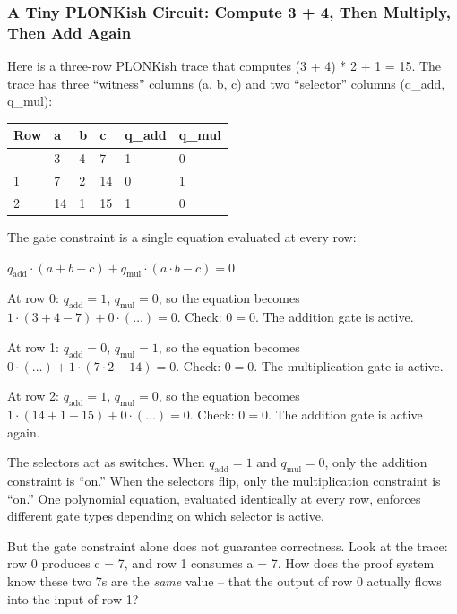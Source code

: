 \documentclass[
  11pt,
  openany]{report}
\begin{document}
\subsubsection{A Tiny PLONKish Circuit: Compute 3 + 4, Then Multiply, Then Add
Again}\label{a-tiny-plonkish-circuit-compute-3-4-then-multiply-then-add-again}

Here is a three-row PLONKish trace that computes (3 + 4) * 2 + 1 = 15. The trace
has three ``witness'' columns (a, b, c) and two ``selector'' columns (q\_add,
q\_mul):

\begin{longtable}[]{@{}llllll@{}}
\toprule\noalign{}
Row & a & b & c & q\_add & q\_mul \\
\midrule\noalign{}
\arrayrulecolor{MidnightBlue}\midrule\arrayrulecolor{MidnightBorder}
\endhead
\bottomrule\noalign{}
\endlastfoot
0 & 3 & 4 & 7 & 1 & 0 \\
1 & 7 & 2 & 14 & 0 & 1 \\
2 & 14 & 1 & 15 & 1 & 0 \\
\end{longtable}

The gate constraint is a single equation evaluated at every row:

\(q_{\text{add}} \cdot (a + b - c) + q_{\text{mul}} \cdot (a \cdot b - c) = 0\)

At row 0: \(q_{\text{add}} = 1\), \(q_{\text{mul}} = 0\), so the equation
becomes \(1 \cdot (3 + 4 - 7) + 0 \cdot (\ldots) = 0\). Check: \(0 = 0\). The
addition gate is active.

At row 1: \(q_{\text{add}} = 0\), \(q_{\text{mul}} = 1\), so the equation
becomes \(0 \cdot (\ldots) + 1 \cdot (7 \cdot 2 - 14) = 0\). Check: \(0 = 0\).
The multiplication gate is active.

At row 2: \(q_{\text{add}} = 1\), \(q_{\text{mul}} = 0\), so the equation
becomes \(1 \cdot (14 + 1 - 15) + 0 \cdot (\ldots) = 0\). Check: \(0 = 0\). The
addition gate is active again.

The selectors act as switches. When \(q_{\text{add}} = 1\) and
\(q_{\text{mul}} = 0\), only the addition constraint is ``on.'' When the
selectors flip, only the multiplication constraint is ``on.'' One polynomial
equation, evaluated identically at every row, enforces different gate types
depending on which selector is active.

But the gate constraint alone does not guarantee correctness. Look at the trace:
row 0 produces c = 7, and row 1 consumes a = 7. How does the proof system know
these two 7s are the \emph{same} value -- that the output of row 0 actually
flows into the input of row 1?
\end{document}
